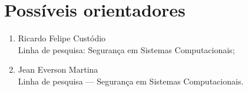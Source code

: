 \documentclass[12pt]{article}
\begin{document}
\section{Possíveis orientadores}

\begin{enumerate}
    \item Ricardo Felipe Custódio \\
    Linha de pesquisa: Segurança em Sistemas Computacionais;
    \item Jean Everson Martina \\
    Linha de pesquisa --- Segurança em Sistemas Computacionais.
\end{enumerate}



\end{document}
